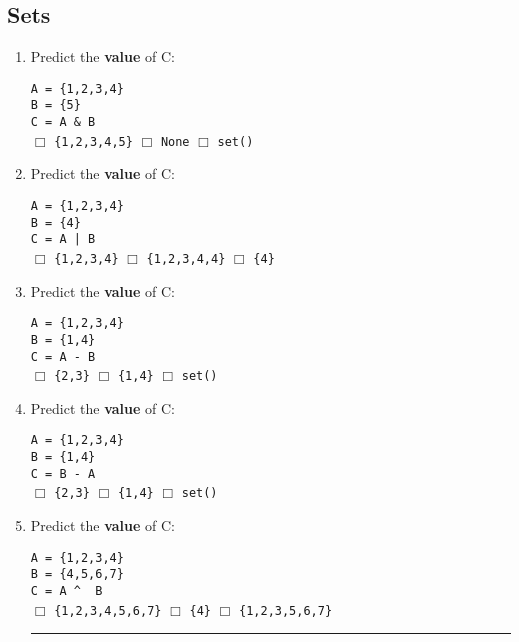 \documentclass[11pt]{report}
\begin{document}
\subsection*{Sets}
\begin{enumerate}

    \item Predict the \textbf{value} of C:

    {\tt A = \{1,2,3,4\}}\\
    {\tt B = \{5\}}\\
    {\tt C = A \& B}\\
    $\Box$ {\tt \{1,2,3,4,5\}} \hspace{3em} $\Box$ {\tt None} \hspace{3em} $\Box$ {\tt set()}

    \item Predict the \textbf{value} of C:

    {\tt A = \{1,2,3,4\}}\\
    {\tt B = \{4\}}\\
    {\tt C = A | B}\\
    $\Box$ {\tt \{1,2,3,4\}} \hspace{3em} $\Box$ {\tt \{1,2,3,4,4\}} \hspace{3em} $\Box$ {\tt \{4\}}

    \item Predict the \textbf{value} of C:

    {\tt A = \{1,2,3,4\}}\\
    {\tt B = \{1,4\}}\\
    {\tt C = A - B}\\
    $\Box$ {\tt \{2,3\}} \hspace{3em} $\Box$ {\tt \{1,4\}} \hspace{3em} $\Box$ {\tt set()}

    \item Predict the \textbf{value} of C:

    {\tt A = \{1,2,3,4\}}\\
    {\tt B = \{1,4\}}\\
    {\tt C = B - A}\\
    $\Box$ {\tt \{2,3\}} \hspace{3em} $\Box$ {\tt \{1,4\}} \hspace{3em} $\Box$ {\tt set()}

    \item Predict the \textbf{value} of C:

    {\tt A = \{1,2,3,4\}}\\
    {\tt B = \{4,5,6,7\}}\\
    {\tt C = A \^ ~B}\\
    $\Box$ {\tt \{1,2,3,4,5,6,7\}} \hspace{3em} $\Box$ {\tt \{4\}} \hspace{3em} $\Box$ {\tt \{1,2,3,5,6,7\}}

    \vspace{2em}
    \hrule
    \vspace{1em}

\end{enumerate}
\end{document}
